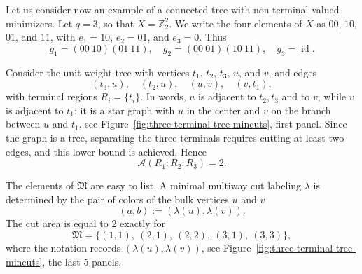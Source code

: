 \documentclass[11pt,oneside,letterpaper]{article}
\numberwithin{equation}{section}
\theoremstyle{definition}
\theoremstyle{remark}
\DeclareMathOperator{\id}{id}
\begin{document}
Let us consider now an example of a connected tree with non-terminal-valued minimizers. Let $q=3$, so that $X=\mathbb{Z}_2^2$.  We write the four elements of
  $X$ as $00$, $10$, $01$, and $11$, with $e_1=10$, $e_2=01$, and $e_3=0$.  Thus
  \begin{equation}
    g_1=(00\ 10)(01\ 11),\quad
    g_2=(00\ 01)(10\ 11),\quad
    g_3=\id .
  \end{equation}

  Consider the unit-weight tree with vertices $t_1$, $t_2$, $t_3$, $u$, and $v$,
  and edges
  \begin{equation}
    (t_3,u),\quad (t_2,u),\quad (u,v),\quad (v,t_1),
  \end{equation}
  with terminal regions $R_i=\{t_i\}$. In words, $u$ is adjacent to
  $t_2,t_3$ and to $v$, while $v$ is adjacent to $t_1$: it is a star graph with $u$ in the center and $v$ on the branch between $u$ and $t_1$, see Figure~\ref{fig:three-terminal-tree-mincuts}, first panel.  Since the graph
  is a tree, separating the three terminals requires cutting at least two
  edges, and this lower bound is achieved. Hence
  \begin{equation}
    \mathcal{A}(R_1:R_2:R_3)=2.
  \end{equation}

  The elements of $\mathfrak{M}$ are easy to list.  A minimal multiway
  cut labeling $\lambda$ is determined by the pair of colors of the bulk vertices $u$ and $v$
  \begin{equation}
    (a,b):=(\lambda(u),\lambda(v)).
  \end{equation}
  The cut area is equal to $2$ exactly for
  \begin{equation}
    \mathfrak{M}
    =
    \{(1,1),\ (2,1),\ (2,2),\ (3,1),\ (3,3)\},
    \label{eq:tree-example-five-mincuts}
  \end{equation}
  where the notation records $(\lambda(u),\lambda(v))$, see Figure~\ref{fig:three-terminal-tree-mincuts}, the last 5 panels.
\end{document}
